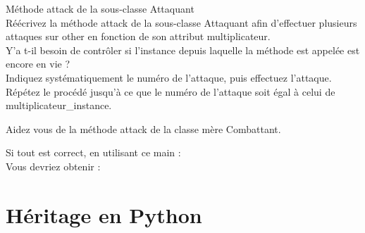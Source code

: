 \begin{Exercice}[10 minutes] Méthode attack de la sous-classe Attaquant \\

Réécrivez la méthode attack de la sous-classe Attaquant afin d'effectuer plusieurs attaques sur other en fonction de son attribut multiplicateur. \\

Y'a t-il besoin de contrôler si l'instance depuis laquelle la méthode est appelée est encore en vie ? \\

Indiquez systématiquement le numéro de l'attaque, puis effectuez l'attaque. Répétez le procédé jusqu'à ce que le numéro de l'attaque soit égal à celui de multiplicateur\_instance.

\begin{conseil}
Aidez vous de la méthode attack de la classe mère Combattant. \\
\end{conseil}

\begin{solution}
	
\end{solution}

\end{Exercice}

Si tout est correct, en utilisant ce main : \\

 

Vous devriez obtenir : \\

 

\section{Héritage en Python}


